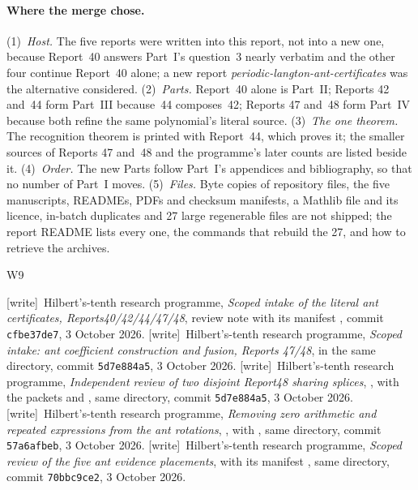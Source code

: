 \documentclass[11pt,letterpaper]{article}
\theoremstyle{definition}\newtheorem{definition}[theorem]{Definition}
\theoremstyle{remark}\newtheorem{remark}[theorem]{Remark}
\newcommand{\wtag}{\textup{[write]}}
\begin{document}
\paragraph{Where the merge chose.} (1)~\emph{Host.} The five reports were
written into this report, not into a new one, because Report~40 answers
Part~I's question~3 nearly verbatim and the other four continue Report~40
alone; a new report \emph{periodic-langton-ant-certificates} was the
alternative considered. (2)~\emph{Parts.} Report~40 alone is Part~II;
Reports 42 and~44 form Part~III because~44 composes~42; Reports 47 and~48
form Part~IV because both refine the same polynomial's literal source. (3)~\emph{The
one theorem.} The recognition theorem is printed with Report~44, which
proves it; the smaller sources of Reports 47 and~48 and the programme's later
counts are listed beside it. (4)~\emph{Order.} The new Parts follow Part~I's
appendices and bibliography, so that no number of Part~I moves. (5)~\emph{Files.}
Byte copies of repository files, the five manuscripts, READMEs, PDFs and
checksum manifests, a Mathlib file and its licence, in-batch duplicates and
27 large regenerable files are not shipped; the report README lists every
one, the commands that rebuild the 27, and how to retrieve the archives.

\begin{thebibliography}{W9}
 \wtag\ Hilbert's-tenth research programme,
\emph{Scoped intake of the literal ant certificates, Reports40/42/44/47/48},
review note
with its manifest , commit
\texttt{cfbe37de7}, 3 October 2026.
 \wtag\ Hilbert's-tenth research programme,
\emph{Scoped intake: ant coefficient construction and fusion, Reports 47/48},
 in the same directory, commit
\texttt{5d7e884a5}, 3 October 2026.
 \wtag\ Hilbert's-tenth research programme,
\emph{Independent review of two disjoint Report48 sharing splices},
, with the packets
 and
, same directory, commit
\texttt{5d7e884a5}, 3 October 2026.
 \wtag\ Hilbert's-tenth research programme,
\emph{Removing zero arithmetic and repeated expressions from the ant
rotations}, , with
, same directory, commit
\texttt{57a6afbeb}, 3 October 2026.
 \wtag\ Hilbert's-tenth research programme,
\emph{Scoped review of the five ant evidence placements},
 with its manifest
, same directory, commit
\texttt{70bbc9ce2}, 3 October 2026.
\end{thebibliography}
\end{document}
